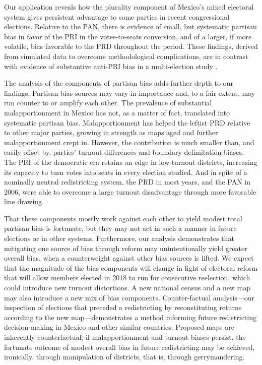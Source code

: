\documentclass[letter,12pt]{article}
\begin{document}
{Our application reveals how the plurality component of Mexico's mixed electoral system gives persistent advantage to some parties in recent congressional elections. Relative to the PAN, there is evidence of small, but systematic partisan bias in favor of the PRI in the votes-to-seats conversion, and of a larger, if more volatile, bias favorable to the PRD throughout the period. These findings, derived from simulated data to overcome methodological complications, are in contrast with evidence of substantive anti-PRI bias in a multi-election study \citep{marquez2014biasBlog}. 

The analysis of the components of partisan bias adds further depth to our findings. Partisan bias sources may vary in importance and, to a fair extent, may run counter to or amplify each other. The prevalence of substantial malapportionment in Mexico has not, as a matter of fact, translated into systematic partisan bias. Malapportionment has helped the leftist PRD relative to other major parties, growing in strength as maps aged and further malapportionment crept in. However, the contribution is much smaller than, and easily offset by, parties' turnout differences and boundary-delimitation biases. The PRI of the democratic era retains an edge in low-turnout districts, increasing its capacity to turn votes into seats in every election studied. And in spite of a nominally neutral redistricting system, the PRD in most years, and the PAN in 2006, were able to overcome a large turnout disadvantage through more favorable line drawing. 

That these components mostly work against each other to yield modest total partisan bias is fortunate, but they may not act in such a manner in future elections or in other systems. Furthermore, our analysis demonstrates that mitigating one source of bias through reform may unintentionally yield greater overall bias, when a counterweight against other bias sources is lifted. We expect that the magnitude of the bias components will change in light of electoral reform that will allow members elected in 2018 to run for consecutive reelection, which could introduce new turnout distortions. A new national census and a new map may also introduce a new mix of bias components. Counter-factual analysis---our inspection of elections that preceded a redistricting by reconstituting returns according to the new map---demonstrates a method informing future redistricting decision-making in Mexico and other similar countries. Proposed maps are inherently counterfactual; if malapportionment and turnout biases persist, the fortunate outcome of modest overall bias in future redistricting may be achieved, ironically, through manipulation of districts, that is, through gerrymandering.

}
\end{document}
